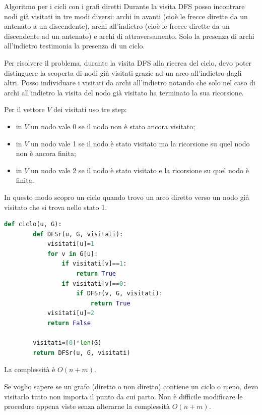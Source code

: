 \begin{Algoritmo}{Algoritmo per i cicli con i grafi diretti}{}
    Durante la visita DFS posso incontrare nodi già visitati in tre modi diversi: archi in avanti (cioè le frecce dirette da un antenato a un discendente), archi all'indietro (cioè le frecce dirette da un discendente ad un antenato) e archi di attraversamento. Solo la presenza di archi all'indietro testimonia la presenza di un ciclo.

    Per risolvere il problema, durante la visita DFS alla ricerca del ciclo, devo poter distinguere la scoperta di nodi già visitati grazie ad un arco all'indietro dagli altri. Posso individuare i visitati da archi all'indietro notando che solo nel caso di archi all'indietro la visita del nodo già visitato ha terminato la sua ricorsione.

    Per il vettore $V$ dei visitati uso tre step:
    \begin{itemize}
        \item in $V$ un nodo vale 0 se il nodo non è stato ancora visitato;
        \item in $V$ un nodo vale 1 se il nodo è stato visitato ma la ricorsione su quel nodo non è ancora finita;
        \item in $V$ un nodo vale 2 se il nodo è stato visitato e la ricorsione su quel nodo è finita.
    \end{itemize}

    In questo modo scopro un ciclo quando trovo un arco diretto verso un nodo già visitato che si trova nello stato 1.

    \begin{lstlisting}[language=Python]
    def ciclo(u, G):
        def DFSr(u, G, visitati):
            visitati[u]=1
            for v in G[u]:
                if visitati[v]==1:
                    return True
                if visitati[v]==0:
                    if DFSr(v, G, visitati):
                        return True
            visitati[u]=2
            return False
            
        visitati=[0]*len(G)
        return DFSr(u, G, visitati)
    \end{lstlisting}

    La complessità è $O(n+m)$.
\end{Algoritmo}

Se voglio sapere se un grafo (diretto o non diretto) contiene un ciclo o meno, devo visitarlo tutto non importa il punto da cui parto. Non è difficile modificare le procedure appena viste senza alterarne la complessità $O(n+m)$.

